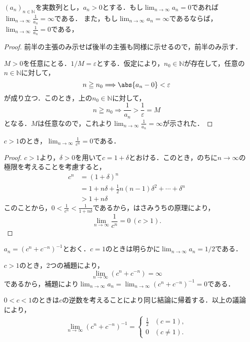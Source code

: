 
\begin{lemma}{}{}

    $(a_n)_{n \in \mathbb{N}}$を実数列とし，$a_n > 0$とする．もし$\lim_{n \to \infty} a_n =0$であれば$\lim_{n \to \infty} \frac{1}{a_n}=\infty$である．
    また，もし$\lim_{n \to \infty} a_n =\infty$であるならば，$\lim_{n \to \infty} \frac{1}{a_n} =0$である，

\end{lemma}

\begin{proof}
    前半の主張のみ示せば後半の主張も同様に示せるので，前半のみ示す．

    $M>0$を任意にとる．$1/M = \varepsilon$とする．仮定により，$n_0 \in \mathbb{N}$が存在して，任意の$n \in \mathbb{N}$に対して，
    \[
        n \geqq n_0 \Longrightarrow \abs{a_n-0}<\varepsilon
    \]
    が成り立つ．このとき，上の$n_0 \in \mathbb{N}$に対して，
    \[
        n \geqq n_0 \Longrightarrow \frac{1}{a_n} >\frac{1}{\varepsilon}=M
    \]
    となる．$M$は任意なので，これより$\lim_{n \to \infty} \frac{1}{a_n}=\infty$が示された．
\end{proof}


\begin{lemma}{}{}



    $c>1$のとき，$\lim_{n \to \infty} \frac{1}{c^n} = 0$である．


\end{lemma}
\begin{proof}
    $c>1$より，$\delta >0$を用いて$c=1+\delta$とおける．このとき，のちに$n \to \infty$の極限を考えることを考慮すると，
    \begin{align*}
        c^n & = (1+\delta)^n                                               \\
            & = 1+n \delta +\frac{1}{2}n (n-1) \delta^2 + \cdots +\delta^n \\
            & > 1+n \delta
    \end{align*}
    このことから，$0<\frac{1}{c^n} <\frac{1}{1+n\delta}$であるから，はさみうちの原理により，
    \[
        \lim_{n \to \infty} \frac{1}{c^n} = 0~(c>1).
    \]
\end{proof}

\begin{tanswer}
    $a_n = (c^n +c^{-n})^{-1}$とおく．$c=1$のときは明らかに$\lim_{n \to \infty} a_n =1/2$である．

    $c>1$のとき，2つの補題により，
    \[
        \lim_{n \to \infty} (c^n + c^{-n}) = \infty
    \]
    であるから，補題により$\lim_{n \to \infty} a_n = \lim_{n \to \infty} (c^n +c^{-n})^{-1} =0$である．

    $0<c<1$のときは$c$の逆数を考えることにより同じ結論に帰着する．以上の議論により，
    \begin{align*}
        \lim_{n \to \infty} (c^n +c^{-n})^{-1} =
        \begin{cases}
            \frac{1}{2} & (c=1)  ,   \\
            0           & (c \ne 1).
        \end{cases}
    \end{align*}
\end{tanswer}


